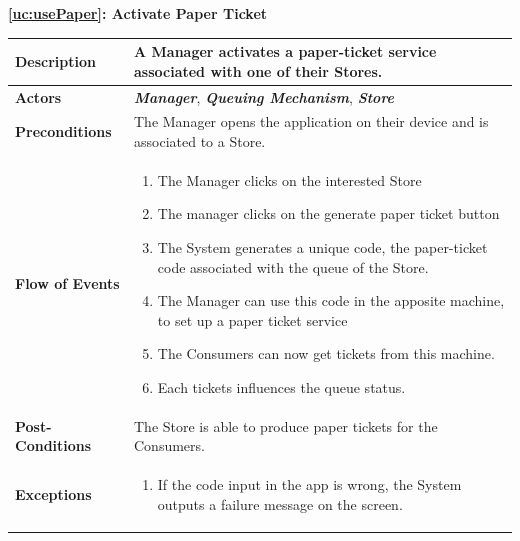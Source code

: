 \documentclass[a4paper, 10pt, oneside]{article}
\begin{document}
\begin{center}
{\textbf{\ref{uc:usePaper}: Activate Paper Ticket}}
\end{center}
\begin{tabularx}{\linewidth}{| l | X |}
	
	\hline
	\textbf{Description} & A Manager activates a paper-ticket service associated with one of their Stores.\\
	

	\hline
	\textbf{Actors} & \textbf{\textit{Manager}}, \textit{\textbf{Queuing Mechanism}}, \textbf{\textit{Store}}\\
	
	\hline
	\textbf{Preconditions} & The Manager opens the application on their device and is associated to a Store.\\
	
	\hline
	\textbf{Flow of Events} & \parbox{0.7\textwidth}{	
		\begin{enumerate}
			\item The Manager clicks on the interested Store
			\item The manager clicks on the generate paper ticket button
			\item The System generates a unique code, the paper-ticket code associated with the queue of the Store.
			\item The Manager can use this code in the apposite machine, to set up a paper ticket service
			\item The Consumers can now get tickets from this machine.
			\item Each tickets influences the queue status.
	\end{enumerate}}\\
	
	\hline
	\textbf{Post-Conditions} & The Store is able to produce paper tickets for the Consumers.\\
	
	\hline
	\textbf{Exceptions} & \parbox{0.7\textwidth}{ \begin{enumerate}
			\item If the code input in the app is wrong, the System outputs a failure message on the screen.
		\end{enumerate}}\\

	\hline
	
\end{tabularx}
\end{document}
